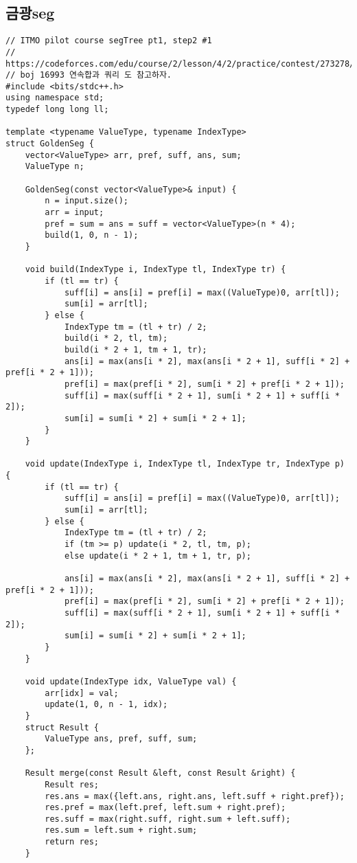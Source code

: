 \documentclass[landscape, 8pt, a4paper, oneside, twocolumn]{extarticle}
\begin{document}
    \subsection{금광seg}
    \begin{verbatim}
// ITMO pilot course segTree pt1, step2 #1
// https://codeforces.com/edu/course/2/lesson/4/2/practice/contest/273278/problem/A
// boj 16993 연속합과 쿼리 도 참고하자.
#include <bits/stdc++.h>
using namespace std;
typedef long long ll;

template <typename ValueType, typename IndexType>
struct GoldenSeg {
    vector<ValueType> arr, pref, suff, ans, sum;
    ValueType n;

    GoldenSeg(const vector<ValueType>& input) {
        n = input.size();
        arr = input;
        pref = sum = ans = suff = vector<ValueType>(n * 4);
        build(1, 0, n - 1);
    }

    void build(IndexType i, IndexType tl, IndexType tr) {
        if (tl == tr) {
            suff[i] = ans[i] = pref[i] = max((ValueType)0, arr[tl]);
            sum[i] = arr[tl];
        } else {
            IndexType tm = (tl + tr) / 2;
            build(i * 2, tl, tm);
            build(i * 2 + 1, tm + 1, tr);
            ans[i] = max(ans[i * 2], max(ans[i * 2 + 1], suff[i * 2] + pref[i * 2 + 1]));
            pref[i] = max(pref[i * 2], sum[i * 2] + pref[i * 2 + 1]);
            suff[i] = max(suff[i * 2 + 1], sum[i * 2 + 1] + suff[i * 2]);
            sum[i] = sum[i * 2] + sum[i * 2 + 1];
        }
    }

    void update(IndexType i, IndexType tl, IndexType tr, IndexType p) {
        if (tl == tr) {
            suff[i] = ans[i] = pref[i] = max((ValueType)0, arr[tl]);
            sum[i] = arr[tl];
        } else {
            IndexType tm = (tl + tr) / 2;
            if (tm >= p) update(i * 2, tl, tm, p);
            else update(i * 2 + 1, tm + 1, tr, p);

            ans[i] = max(ans[i * 2], max(ans[i * 2 + 1], suff[i * 2] + pref[i * 2 + 1]));
            pref[i] = max(pref[i * 2], sum[i * 2] + pref[i * 2 + 1]);
            suff[i] = max(suff[i * 2 + 1], sum[i * 2 + 1] + suff[i * 2]);
            sum[i] = sum[i * 2] + sum[i * 2 + 1];
        }
    }

    void update(IndexType idx, ValueType val) {
        arr[idx] = val;
        update(1, 0, n - 1, idx);
    }
    struct Result {
        ValueType ans, pref, suff, sum;
    };

    Result merge(const Result &left, const Result &right) {
        Result res;
        res.ans = max({left.ans, right.ans, left.suff + right.pref});
        res.pref = max(left.pref, left.sum + right.pref);
        res.suff = max(right.suff, right.sum + left.suff);
        res.sum = left.sum + right.sum;
        return res;
    }


\end{verbatim}
\end{document}
